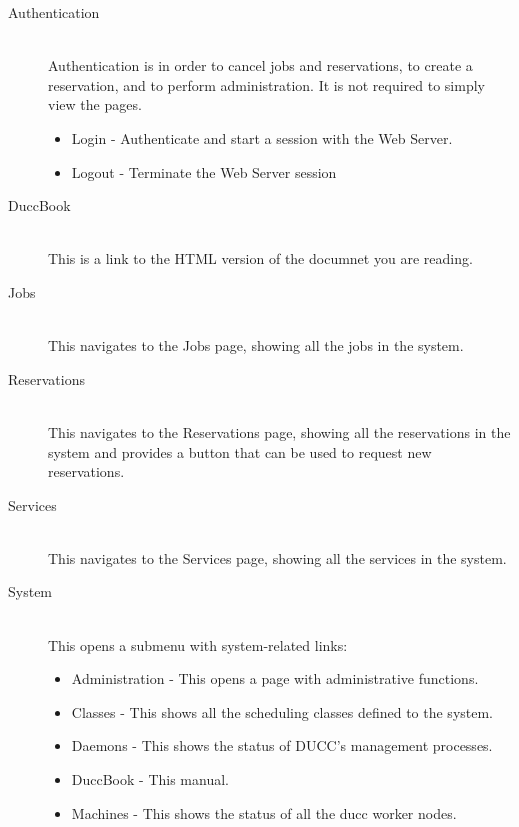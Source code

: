        \begin{description}
          \item[Authentication] \hfill \\ 
            Authentication is in order to cancel jobs and reservations, to create a
            reservation, and to perform administration. It is not required to simply view the pages.

            \begin{itemize}
              \item Login - Authenticate and start a session with the Web Server.             
              \item Logout - Terminate the Web Server session 
            \end{itemize}


          \item[DuccBook] \hfill \\
            This is a link to the HTML version of the documnet you are reading.

          \item[Jobs] \hfill \\
            This navigates to the Jobs page, showing all the jobs in the system.

          \item[Reservations] \hfill \\
            This navigates to the Reservations page, showing all the reservations
            in the system and provides a button that can be used to request new reservations. 

          \item[Services] \hfill \\
            This navigates to the Services page, showing all the services in the
            system.

          \item[System] \hfill \\
            This opens a submenu with system-related links:
            \begin{itemize}
              \item[] Administration - This opens a page with administrative functions. 
              \item[] Classes - This shows all the scheduling classes defined to the system. 
              \item[] Daemons - This shows the status of DUCC's management processes. 
              \item[] DuccBook - This manual. 
              \item[] Machines - This shows the status of all the ducc worker nodes. 
            \end{itemize}
      \end{description}              

      
      
      
